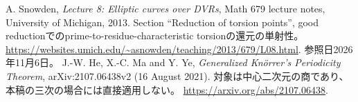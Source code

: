 A. Snowden, \emph{Lecture 8: Elliptic curves over DVRs},
Math 679 lecture notes, University of Michigan, 2013.
Section ``Reduction of torsion points'', good reductionでのprime-to-residue-characteristic torsionの還元の単射性。
\url{https://websites.umich.edu/~asnowden/teaching/2013/679/L08.html}.
参照日2026年11月6日。
J.-W. He, X.-C. Ma and Y. Ye, \emph{Generalized Kn\"orrer's Periodicity Theorem},
arXiv:2107.06438v2 (16 August 2021).
対象は中心二次元の商であり、本稿の三次の場合には直接適用しない。
\url{https://arxiv.org/abs/2107.06438}.
